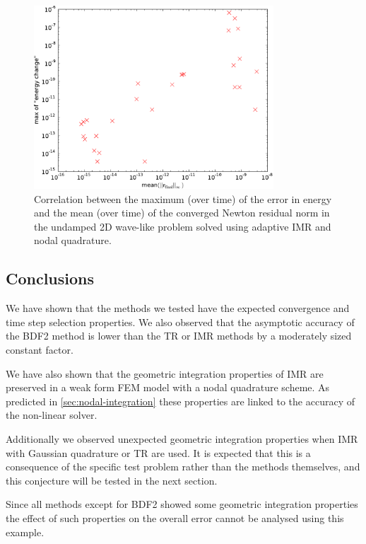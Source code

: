 \begin{figure}
  \centering
  \includegraphics[width=0.8\textwidth]
  {plots/2d_wave_solution_energy_newton_res/maxofenergychangevsmeanminofnewtonresiduals.pdf}
  \caption{Correlation between the maximum (over time) of the error in energy and the mean (over time) of the converged Newton residual norm in the undamped 2D wave-like problem solved using adaptive IMR and nodal quadrature.
  }
  \label{fig:energy-error-2d-nodal-newton-tests}
\end{figure}



\subsection{Conclusions}

We have shown that the methods we tested have the expected convergence and time step selection properties.
We also observed that the asymptotic accuracy of the BDF2 method is lower than the TR or IMR methods by a moderately sized constant factor.

We have also shown that the geometric integration properties of IMR are preserved in a weak form FEM model with a nodal quadrature scheme.
As predicted in \cref{sec:nodal-integration} these properties are linked to the accuracy of the non-linear solver.

Additionally we observed unexpected geometric integration properties when IMR with Gaussian quadrature or TR are used.
It is expected that this is a consequence of the specific test problem rather than the methods themselves, and this conjecture will be tested in the next section.

Since all methods except for BDF2 showed some geometric integration properties the effect of such properties on the overall error cannot be analysed using this example.


